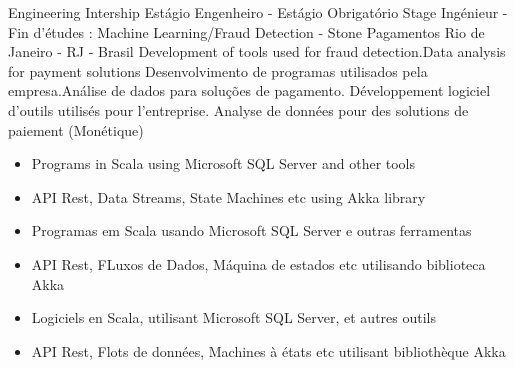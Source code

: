\cventry{\oct\ 2018\newline \feb\ 2019\newline}
{
  \ml%
  {Engineering Intership}
  {Estágio Engenheiro - Estágio Obrigatório}
  {Stage Ingénieur - Fin d'études}}
{\newline {}: Machine Learning/Fraud Detection - Stone Pagamentos}
{\newline Rio de Janeiro - RJ - Brasil}
{\newline
  \ml%
  {Development of tools used for fraud detection.\newline Data analysis for payment solutions}
  {Desenvolvimento de programas utilisados pela empresa.\newline Análise
    de dados para soluções de pagamento.}
  {Développement logiciel d'outils utilisés pour l'entreprise. \newline
    Analyse de données pour des solutions de paiement (Monétique)}}
{\ml%
  {
    \begin{itemize}
    \item Programs in Scala using Microsoft SQL Server and other tools
    \item API Rest, Data Streams, State Machines etc using Akka library
    \end{itemize}
  }
  {
    \begin{itemize}
    \item Programas em Scala usando Microsoft SQL Server e outras ferramentas
    \item API Rest, FLuxos de Dados, Máquina de estados etc utilisando
      biblioteca Akka
    \end{itemize}
  }
  {
    \begin{itemize}
    \item Logiciels en Scala, utilisant Microsoft SQL Server, et
      autres outils
    \item API Rest, Flots de données, Machines à états etc utilisant
      bibliothèque Akka
    \end{itemize}
}
}

